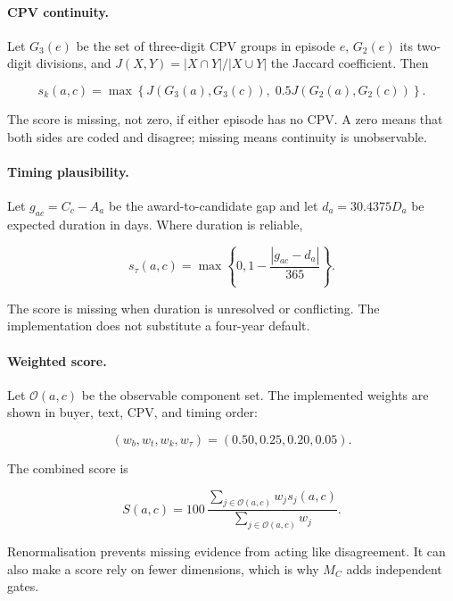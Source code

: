 \documentclass[11pt,a4paper]{article}
\begin{document}
\paragraph{CPV continuity.}
Let $G_3(e)$ be the set of three-digit CPV groups in episode $e$, $G_2(e)$ its
two-digit divisions, and $J(X,Y)=|X\cap Y|/|X\cup Y|$ the Jaccard coefficient. Then

\begin{equation}
s_k(a,c)=\max\left\{J(G_3(a),G_3(c)),\;0.5J(G_2(a),G_2(c))\right\}.
\end{equation}

The score is missing, not zero, if either episode has no CPV. A zero means that both
sides are coded and disagree; missing means continuity is unobservable.

\paragraph{Timing plausibility.}
Let $g_{ac}=C_c-A_a$ be the award-to-candidate gap and let
$d_a=30.4375D_a$ be expected duration in days. Where duration is reliable,

\begin{equation}
s_{\tau}(a,c)=\max\left\{0,1-\frac{|g_{ac}-d_a|}{365}\right\}.
\end{equation}

The score is missing when duration is unresolved or conflicting. The implementation
does not substitute a four-year default.

\paragraph{Weighted score.}
Let $\mathcal{O}(a,c)$ be the observable component set. The implemented weights are
shown in buyer, text, CPV, and timing order:

\begin{equation}
(w_b,w_t,w_k,w_{\tau})=(0.50,0.25,0.20,0.05).
\end{equation}

The combined score is

\begin{equation}
S(a,c)=100\,
\frac{\sum_{j\in\mathcal{O}(a,c)}w_js_j(a,c)}
{\sum_{j\in\mathcal{O}(a,c)}w_j}.
\label{eq:weightedscore}
\end{equation}

Renormalisation prevents missing evidence from acting like disagreement. It can also
make a score rely on fewer dimensions, which is why $M_C$ adds independent gates.
\end{document}
